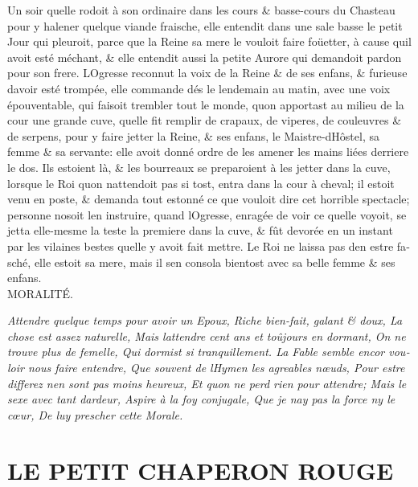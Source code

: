 \documentclass[14pt,a4paper]{memoir}
\begin{document}
\begin{otherlanguage}{french}
Un soir qu\textquotesingle elle rodoit à son ordinaire dans les cours \&
basse-cours du Chasteau pour y halener quelque viande fraische, elle
entendit dans une sale basse le petit Jour qui pleuroit, parce que la
Reine sa mere le vouloit faire foüetter, à cause qu\textquotesingle il
avoit esté méchant, \& elle entendit aussi la petite Aurore qui
demandoit pardon pour son frere. L\textquotesingle Ogresse reconnut la
voix de la Reine \& de ses enfans, \& furieuse d\textquotesingle avoir
esté trompée, elle commande dés le lendemain au matin, avec une voix
épouventable, qui faisoit trembler tout le monde, qu\textquotesingle on
apportast au milieu de la cour une grande cuve, qu\textquotesingle elle
fit remplir de crapaux, de viperes, de couleuvres \& de serpens, pour y
faire jetter la Reine, \& ses enfans, le
Maistre-d\textquotesingle Hôstel, sa femme \& sa servante: elle avoit
donné ordre de les amener les mains liées derriere le dos. Ils estoient
là, \& les bourreaux se preparoient à les jetter dans la cuve, lorsque
le Roi qu\textquotesingle on n\textquotesingle attendoit pas si tost,
entra dans la cour à cheval; il estoit venu en poste, \& demanda tout
estonné ce que vouloit dire cet horrible spectacle; personne
n\textquotesingle osoit l\textquotesingle en instruire, quand
l\textquotesingle Ogresse, enragée de voir ce quelle voyoit, se jetta
elle-mesme la teste la premiere dans la cuve, \& fût devorée en un
instant par les vilaines bestes qu\textquotesingle elle y avoit fait
mettre. Le Roi ne laissa pas d\textquotesingle en estre fasché, elle
estoit sa mere, mais il s\textquotesingle en consola bientost avec sa
belle femme \& ses enfans. \\

MORALITÉ.

\emph{{Attendre quelque temps pour avoir un Epoux,} {Riche bien-fait,
galant \& doux,} {La chose est assez naturelle,} {Mais
l\textquotesingle attendre cent ans et toûjours en dormant, } { On ne
trouve plus de femelle,} {Qui dormist si tranquillement.} {La Fable
semble encor vouloir nous faire entendre,} {Que souvent de
l\textquotesingle Hymen les agreables nœuds, } {Pour estre differez
n\textquotesingle en sont pas moins heureux, } {Et qu\textquotesingle on
ne perd rien pour attendre;} {Mais le sexe avec tant
d\textquotesingle ardeur,} {Aspire à la foy conjugale,} {Que je
n\textquotesingle ay pas la force ny le cœur,} {De luy prescher cette
Morale.}}

\section{LE PETIT CHAPERON ROUGE}


\end{otherlanguage}
\end{document}
